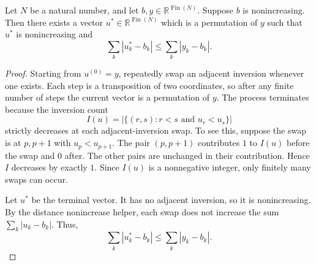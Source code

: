 \begin{helper}
Let \(N\) be a natural number, and let \(b, y \in \mathbb{R}^{\operatorname{Fin}(N)}\).
Suppose \(b\) is nonincreasing.
Then there exists a vector \(u^* \in \mathbb{R}^{\operatorname{Fin}(N)}\) which is a permutation of \(y\) such that \(u^*\) is nonincreasing and
\[
\sum_k |u^*_k - b_k| \le \sum_k |y_k - b_k|.
\]
\end{helper}
\begin{proof}
Starting from \(u^{(0)}=y\), repeatedly swap an adjacent inversion whenever one exists. Each step is a transposition of two coordinates, so after any finite number of steps the current vector is a permutation of \(y\).
The process terminates because the inversion count
\[
I(u) = |\{(r, s) : r < s \text{ and } u_r < u_s\}|
\]
strictly decreases at each adjacent-inversion swap. To see this, suppose the swap is at \(p, p+1\) with \(u_p < u_{p+1}\). The pair \((p, p+1)\) contributes \(1\) to \(I(u)\) before the swap and \(0\) after. The other pairs are unchanged in their contribution. Hence \(I\) decreases by exactly \(1\). Since \(I(u)\) is a nonnegative integer, only finitely many swaps can occur.

Let \(u^*\) be the terminal vector. It has no adjacent inversion, so it is nonincreasing. By the distance nonincrease helper, each swap does not increase the sum \(\sum_k |u_k - b_k|\). Thus,
\[
\sum_k |u^*_k - b_k| \le \sum_k |y_k - b_k|.
\]
\end{proof}
